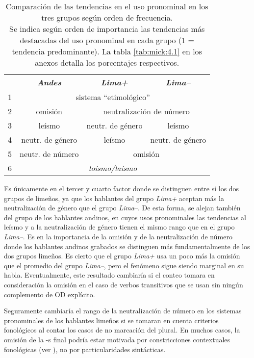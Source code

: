 \documentclass[output=paper]{../langscibook}
\begin{document}
\begin{table}
\caption{\label{tab:mick:4} Comparación de las tendencias en el uso pronominal en los tres grupos según orden de frecuencia.\\Se indica según orden de importancia las tendencias más destacadas del uso pronominal en cada grupo (1 = tendencia predominante). La tabla \ref{tab:mick:4.1} en los anexos detalla los porcentajes respectivos.}

\begin{tabular}{|l|c|c|c|}
\hline
 &  {\textbf{\textit{Andes}}} &  {\textbf{\textit{Lima+}}} &  {\textbf{\textit{Lima–}}}\\
\hline
1 & \multicolumn{3}{c|}{ sistema “etimológico”}\\
\hline
2 & omisión & \multicolumn{2}{c|}{ neutralización de número}\\
\hline
3 & leísmo & neutr. de género & leísmo\\
\hline
4 & neutr. de género & leísmo & neutr. de género\\
\hline
5 & neutr. de número & \multicolumn{2}{c|}{ omisión}\\
\hline
6 & \multicolumn{3}{c|}{ \textit{loísmo/laísmo}}\\
\hline
\end{tabular}
\end{table}

Es únicamente en el tercer y cuarto factor donde se distinguen entre sí los dos grupos de limeños, ya que los hablantes del grupo \textit{Lima+} aceptan más la neutralización de género que el grupo \textit{Lima}–. De esta forma, se alejan también del grupo de los hablantes andinos, en cuyos usos pronominales las tendencias al leísmo y a la neutralización de género tienen el mismo rango que en el grupo \textit{Lima–}. Es en la importancia de la omisión y de la neutralización de número donde los hablantes andinos grabados se distinguen más fundamentalmente de los dos grupos limeños. Es cierto que el grupo \textit{Lima+} usa un poco más la omisión que el promedio del grupo \textit{Lima–}, pero el fenómeno sigue siendo marginal en su habla. Eventualmente, este resultado cambiaría si el conteo tomara en consideración la omisión en el caso de verbos transitivos que se usan sin ningún complemento de OD explícito. 

Seguramente cambiaría el rango de la neutralización de número en los sistemas pronominales de los hablantes limeños si se tomaran en cuenta criterios fonológicos al contar los casos de no marcación del plural. En muchos casos, la omisión de la -s final podría estar motivada por constricciones contextuales fonológicas (ver \citet{Caravedo1990}), no por particularidades sintácticas.
\end{document}
